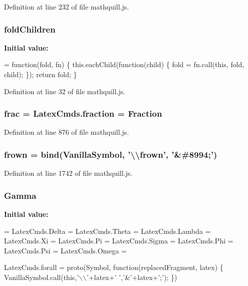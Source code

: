 Definition at line 232 of file mathquill.\-js.

\subsubsection[{fold\-Children}]{\setlength{\rightskip}{0pt plus 5cm}{\bf \-\_\-} fold\-Children}\label{mathquill_8js_aeb1342aeda1a97cbdd7b3a86dad7f2ba}
{\bfseries Initial value\-:}
\begin{DoxyCode}
= \textcolor{keyword}{function}(fold, fn) \{
  this.eachChild(\textcolor{keyword}{function}(child) \{
    fold = fn.call(\textcolor{keyword}{this}, fold, child);
  \});
  \textcolor{keywordflow}{return} fold;
\}
\end{DoxyCode}


Definition at line 32 of file mathquill.\-js.

\subsubsection[{frac}]{ frac = Latex\-Cmds.\-fraction = {\bf Fraction}}\label{mathquill_8js_a4be6e5b63624f7481409aca64a0aa7d4}


Definition at line 876 of file mathquill.\-js.

\subsubsection[{frown}]{ frown = {\bf bind}({\bf Vanilla\-Symbol}, '\textbackslash{}\textbackslash{}frown', '\&\#8994;')}\label{mathquill_8js_a0b10787d52ee6cbb0a6c095dca12c67a}


Definition at line 1742 of file mathquill.\-js.

\subsubsection[{Gamma}]{ Gamma}\label{mathquill_8js_a2eca9c4d83bc638c13e229e21fbe88c0}
{\bfseries Initial value\-:}
\begin{DoxyCode}
=
LatexCmds.Delta =
LatexCmds.Theta =
LatexCmds.Lambda =
LatexCmds.Xi =
LatexCmds.Pi =
LatexCmds.Sigma =
LatexCmds.Phi =
LatexCmds.Psi =
LatexCmds.Omega =


LatexCmds.forall = proto(Symbol, \textcolor{keyword}{function}(replacedFragment, latex) \{
  VanillaSymbol.call(\textcolor{keyword}{this},\textcolor{charliteral}{'\(\backslash\)\(\backslash\)'}+latex+\textcolor{charliteral}{' '},\textcolor{charliteral}{'&'}+latex+\textcolor{charliteral}{';'});
\})
\end{DoxyCode}


